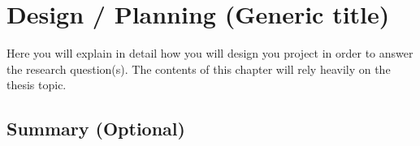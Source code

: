 \chapter{Design / Planning (Generic title)}
\label{chap:design} 

Here you will explain in detail how you will design you project in order to answer the research question(s). The contents of this chapter will rely heavily on the thesis topic.

 
\lipsum[22-33]
 
\section{Summary (Optional)}





